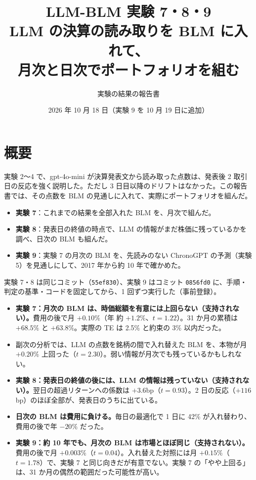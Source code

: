 \documentclass[xelatex,ja=standard,jafont=haranoaji,a4paper,10pt,openany]{bxjsreport}
\title{LLM-BLM 実験 7・8・9\\[6pt]
  \large LLM の決算の読み取りを BLM に入れて、\\月次と日次でポートフォリオを組む}
\author{実験の結果の報告書}
\date{2026 年 10 月 18 日（実験 9 を 10 月 19 日に追加）}
\newcommand{\code}[1]{\texttt{#1}}
\begin{document}
\maketitle

\chapter*{概要}

実験 2〜4 で、gpt-4o-mini が決算発表文から読み取った点数は、発表後 2 取引日の反応を強く説明した。ただし 3 日目以降のドリフトはなかった。この報告書では、その点数を BLM の見通しに入れて、実際にポートフォリオを組んだ。

\begin{itemize}
\item \textbf{実験 7}：これまでの結果を全部入れた BLM を、月次で組んだ。
\item \textbf{実験 8}：発表日の終値の時点で、LLM の情報がまだ株価に残っているかを調べ、日次の BLM も組んだ。
\item \textbf{実験 9}：実験 7 の月次の BLM を、先読みのない ChronoGPT の予測（実験 5）を見通しにして、2017 年から約 10 年で確かめた。
\end{itemize}

実験 7・8 は同じコミット（\code{55ef830}）、実験 9 はコミット \code{0856fd0} に、手順・判定の基準・コードを固定してから、1 回ずつ実行した（事前登録）。

\begin{keybox}[主な結論]
\begin{itemize}
\item \textbf{実験 7：月次の BLM は、時価総額を有意には上回らない（支持されない）。}費用の後で月 $+0.10\%$（年 約 $+1.2\%$、$t=1.22$）。31 か月の累積は $+68.5\%$ と $+63.8\%$。実際の TE は 2.5\% と約束の 3\% 以内だった。
\item 副次の分析では、LLM の点数を銘柄の間で入れ替えた BLM を、本物が月 $+0.20\%$ 上回った（$t=2.30$）。弱い情報が月次でも残っているかもしれない。
\item \textbf{実験 8：発表日の終値の後には、LLM の情報は残っていない（支持されない）。}翌日の超過リターンへの係数は $+3.6$bp（$t=0.93$）。2 日の反応（$+116$bp）のほぼ全部が、発表日のうちに出ている。
\item \textbf{日次の BLM は費用に負ける。}毎日の最適化で 1 日に 42\% が入れ替わり、費用の後で年 $-20\%$ だった。
\item \textbf{実験 9：約 10 年でも、月次の BLM は市場とほぼ同じ（支持されない）。}費用の後で月 $+0.003\%$（$t=0.04$）。入れ替えた対照には月 $+0.15\%$（$t=1.78$）で、実験 7 と同じ向きだが有意でない。実験 7 の「やや上回る」は、31 か月の偶然の範囲だった可能性が高い。
\end{itemize}
\end{keybox}
\end{document}
